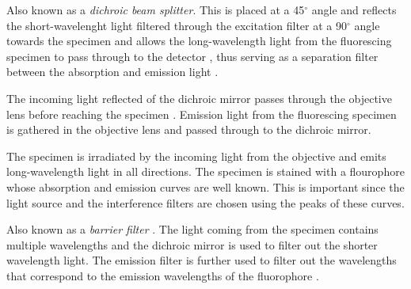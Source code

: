 \begin{definition}
	Also known as a \textit{dichroic beam splitter}.
	This is placed at a 45$^{\circ}$ angle and reflects the short-wavelenght light filtered through the excitation filter at a 90$^{\circ}$ angle towards the specimen \citep{Danek2012,Hubeny2008,Spring2003,CudeBurke2014} and allows the long-wavelength light from the fluorescing specimen to pass through to the detector \citep{LichtmanConchello2005,Koch1972}, thus serving as a separation filter between the absorption and emission light \citep{Fatima2008,Dobrucki2013}.
\end{definition}

\begin{definition}[Objective]
	The incoming light reflected of the dichroic mirror passes through the objective lens before reaching the specimen \citep{Danek2012,Hubeny2008,LichtmanConchello2005,Spring2003}.
	Emission light from the fluorescing specimen is gathered in the objective lens and passed through to the dichroic mirror.
\end{definition}

\begin{definition}[Specimen]
	The specimen is irradiated by the incoming light from the objective and emits long-wavelength light in all directions.
	The specimen is stained with a flourophore whose absorption and emission curves are well known.
	This is important since the light source and the interference filters are chosen using the peaks of these curves.
\end{definition}

\begin{definition}
	Also known as a \textit{barrier filter} \citep{LichtmanConchello2005,Spring2003,Koch1972}.
	The light coming from the specimen contains multiple wavelengths and the dichroic mirror is used to filter out the shorter wavelength light.
	The emission filter is further  used to filter out the wavelengths that correspond to the emission wavelengths of the fluorophore \citep{CudeBurke2014,Danek2012,Hubeny2008,SpringDavisdson2016,ThermoFisher2016}.
\end{definition}


